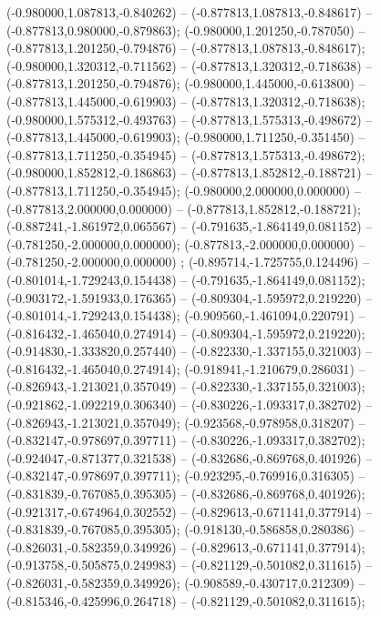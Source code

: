  (-0.980000,1.087813,-0.840262) -- (-0.877813,1.087813,-0.848617) -- (-0.877813,0.980000,-0.879863);
 (-0.980000,1.201250,-0.787050) -- (-0.877813,1.201250,-0.794876) -- (-0.877813,1.087813,-0.848617);
 (-0.980000,1.320312,-0.711562) -- (-0.877813,1.320312,-0.718638) -- (-0.877813,1.201250,-0.794876);
 (-0.980000,1.445000,-0.613800) -- (-0.877813,1.445000,-0.619903) -- (-0.877813,1.320312,-0.718638);
 (-0.980000,1.575312,-0.493763) -- (-0.877813,1.575313,-0.498672) -- (-0.877813,1.445000,-0.619903);
 (-0.980000,1.711250,-0.351450) -- (-0.877813,1.711250,-0.354945) -- (-0.877813,1.575313,-0.498672);
 (-0.980000,1.852812,-0.186863) -- (-0.877813,1.852812,-0.188721) -- (-0.877813,1.711250,-0.354945);
 (-0.980000,2.000000,0.000000) -- (-0.877813,2.000000,0.000000) -- (-0.877813,1.852812,-0.188721);
 (-0.887241,-1.861972,0.065567) -- (-0.791635,-1.864149,0.081152) -- (-0.781250,-2.000000,0.000000);
 (-0.877813,-2.000000,0.000000) -- (-0.781250,-2.000000,0.000000) ;
 (-0.895714,-1.725755,0.124496) -- (-0.801014,-1.729243,0.154438) -- (-0.791635,-1.864149,0.081152);
 (-0.903172,-1.591933,0.176365) -- (-0.809304,-1.595972,0.219220) -- (-0.801014,-1.729243,0.154438);
 (-0.909560,-1.461094,0.220791) -- (-0.816432,-1.465040,0.274914) -- (-0.809304,-1.595972,0.219220);
 (-0.914830,-1.333820,0.257440) -- (-0.822330,-1.337155,0.321003) -- (-0.816432,-1.465040,0.274914);
 (-0.918941,-1.210679,0.286031) -- (-0.826943,-1.213021,0.357049) -- (-0.822330,-1.337155,0.321003);
 (-0.921862,-1.092219,0.306340) -- (-0.830226,-1.093317,0.382702) -- (-0.826943,-1.213021,0.357049);
 (-0.923568,-0.978958,0.318207) -- (-0.832147,-0.978697,0.397711) -- (-0.830226,-1.093317,0.382702);
 (-0.924047,-0.871377,0.321538) -- (-0.832686,-0.869768,0.401926) -- (-0.832147,-0.978697,0.397711);
 (-0.923295,-0.769916,0.316305) -- (-0.831839,-0.767085,0.395305) -- (-0.832686,-0.869768,0.401926);
 (-0.921317,-0.674964,0.302552) -- (-0.829613,-0.671141,0.377914) -- (-0.831839,-0.767085,0.395305);
 (-0.918130,-0.586858,0.280386) -- (-0.826031,-0.582359,0.349926) -- (-0.829613,-0.671141,0.377914);
 (-0.913758,-0.505875,0.249983) -- (-0.821129,-0.501082,0.311615) -- (-0.826031,-0.582359,0.349926);
 (-0.908589,-0.430717,0.212309) -- (-0.815346,-0.425996,0.264718) -- (-0.821129,-0.501082,0.311615);
